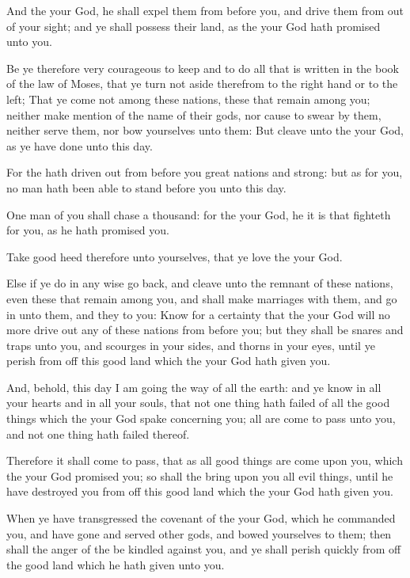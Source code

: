 \Verse And the \LORD your God, he shall expel them from before you, and drive them from out of your sight; and ye shall possess their land, as the \LORD your God hath promised unto you.

\Verse Be ye therefore very courageous to keep and to do all that is written in the book of the law of Moses, that ye turn not aside therefrom to the right hand or to the left; \Verse That ye come not among these nations, these that remain among you; neither make mention of the name of their gods, nor cause to swear by them, neither serve them, nor bow yourselves unto them: \Verse But cleave unto the \LORD your God, as ye have done unto this day.

\Verse For the \LORD hath driven out from before you great nations and strong: but as for you, no man hath been able to stand before you unto this day.

\Verse One man of you shall chase a thousand: for the \LORD your God, he it is that fighteth for you, as he hath promised you.

\Verse Take good heed therefore unto yourselves, that ye love the \LORD your God.

\Verse Else if ye do in any wise go back, and cleave unto the remnant of these nations, even these that remain among you, and shall make marriages with them, and go in unto them, and they to you: \Verse Know for a certainty that the \LORD your God will no more drive out any of these nations from before you; but they shall be snares and traps unto you, and scourges in your sides, and thorns in your eyes, until ye perish from off this good land which the \LORD your God hath given you.

\Verse And, behold, this day I am going the way of all the earth: and ye know in all your hearts and in all your souls, that not one thing hath failed of all the good things which the \LORD your God spake concerning you; all are come to pass unto you, and not one thing hath failed thereof.

\Verse Therefore it shall come to pass, that as all good things are come upon you, which the \LORD your God promised you; so shall the \LORD bring upon you all evil things, until he have destroyed you from off this good land which the \LORD your God hath given you.

\Verse When ye have transgressed the covenant of the \LORD your God, which he commanded you, and have gone and served other gods, and bowed yourselves to them; then shall the anger of the \LORD be kindled against you, and ye shall perish quickly from off the good land which he hath given unto you.



